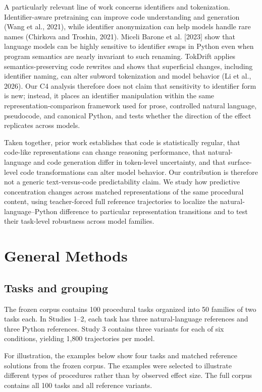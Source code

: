 \documentclass[sn-mathphys-num]{sn-jnl}
\begin{document}
A particularly relevant line of work concerns identifiers and tokenization. Identifier-aware pretraining can improve code understanding and generation (Wang et al., 2021), while identifier anonymization can help models handle rare names (Chirkova and Troshin, 2021). Miceli Barone et al. [2023] show that language models can be highly sensitive to identifier swaps in Python even when program semantics are nearly invariant to such renaming. TokDrift applies semantics-preserving code rewrites and shows that superficial changes, including identifier naming, can alter subword tokenization and model behavior (Li et al., 2026). Our C4 analysis therefore does not claim that sensitivity to identifier form is new; instead, it places an identifier manipulation within the same representation-comparison framework used for prose, controlled natural language, pseudocode, and canonical Python, and tests whether the direction of the effect replicates across models.

Taken together, prior work establishes that code is statistically regular, that code-like representations can change reasoning performance, that natural-language and code generation differ in token-level uncertainty, and that surface-level code transformations can alter model behavior. Our contribution is therefore not a generic text-versus-code predictability claim. We study how predictive concentration changes across matched representations of the same procedural content, using teacher-forced full reference trajectories to localize the natural-language--Python difference to particular representation transitions and to test their task-level robustness across model families.

\section{General Methods}

\subsection{Tasks and grouping}

The frozen corpus contains 100 procedural tasks organized into 50 families of two tasks each. In Studies 1--2, each task has three natural-language references and three Python references. Study 3 contains three variants for each of six conditions, yielding 1,800 trajectories per model.

For illustration, the examples below show four tasks and matched reference solutions from the frozen corpus. The examples were selected to illustrate different types of procedures rather than by observed effect size. The full corpus contains all 100 tasks and all reference variants.
\end{document}
